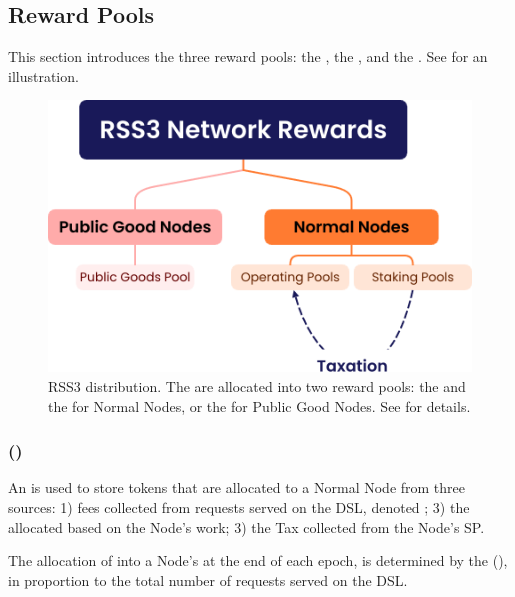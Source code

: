 \subsection{Reward Pools}
\label{subsec:reward_pools}

This section introduces the three reward pools: the , the , and the . See  for an illustration.

{
\begin{figure}[tb!]
    \centering
    \includegraphics[width=0.9\columnwidth]{figures/network-rewards.png}
    \caption{RSS3  distribution.
    The  are allocated into two reward pools: the  and the  for Normal Nodes, or the  for Public Good Nodes.
    See  for details.}
    \label{fig:network-rewards}
\end{figure}
}

\subsubsection{ ()}
\label{subsubsec:operating_pool}

An  is used to store tokens that are allocated to a Normal Node from three sources: 1) fees collected from requests served on the \gls{DSL}, denoted ; 3) the  allocated based on the Node’s work; 3) the \gls{Tax} collected from the Node's \gls{SP}.

The allocation of  into a Node's  at the end of each epoch, is determined by the  (), in proportion to the total number of requests served on the \gls{DSL}.

